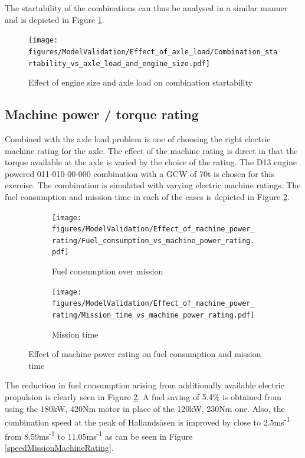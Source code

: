 \documentclass[ExampleMasters.tex]{subfiles}
\begin{document}
The startability of the combinations can thus be analysed in a similar manner and is depicted in Figure \ref{startabilityEngineAxleLoad}.\\

\begin{figure}[h!]
\centering
\texttt{[image: figures/ModelValidation/Effect\_of\_axle\_load/Combination\_startability\_vs\_axle\_load\_and\_engine\_size.pdf]}
\caption{Effect of engine size and axle load on combination startability}
\label{startabilityEngineAxleLoad}
\end{figure}

\subsection{Machine power / torque rating}

Combined with the axle load problem is one of choosing the right electric machine rating for the axle. The effect of the machine rating is direct in that the torque available at the axle is varied by the choice of the rating. The D13 engine powered 011-010-00-000 combination with a GCW of 70t is chosen for this exercise. The combination is simulated with varying electric machine ratings. The fuel consumption and mission time in each of the cases is depicted in Figure \ref{fuelTimeEngineAxleLoad}.\\

\begin{figure}[h!]
\begin{subfigure}{.5\textwidth}
	\centering
	\texttt{[image: figures/ModelValidation/Effect\_of\_machine\_power\_rating/Fuel\_consumption\_vs\_machine\_power\_rating.pdf]}
	\caption{Fuel consumption over mission}
\end{subfigure}
\begin{subfigure}{.5\textwidth}
	\centering
	\texttt{[image: figures/ModelValidation/Effect\_of\_machine\_power\_rating/Mission\_time\_vs\_machine\_power\_rating.pdf]}
	\caption{Mission time}
\end{subfigure}
\caption{Effect of machine power rating on fuel consumption and mission time}
\label{fuelTimeEngineAxleLoad}
\end{figure}

The reduction in fuel consumption arising from additionally available electric propulsion is clearly seen in Figure \ref{fuelTimeEngineAxleLoad}. A fuel saving of 5.4\% is obtained from using the 180kW, 420Nm motor in place of the 120kW, 230Nm one. Also, the combination speed at the peak of Hallands\aa sen is improved by close to 2.5ms\textsuperscript{-1} from 8.59ms\textsuperscript{-1} to 11.05ms\textsuperscript{-1} as can be seen in Figure \ref{speedMissionMachineRating}.\\
\end{document}
